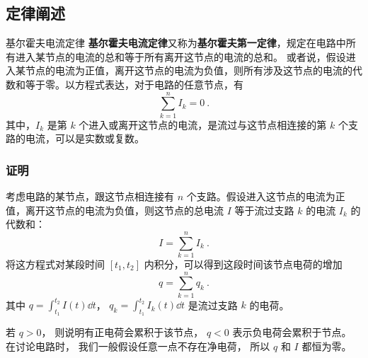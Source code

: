 

\subsection{定律阐述}
\begin{theorem}{基尔霍夫电流定律}
\textbf{基尔霍夫电流定律}又称为\textbf{基尔霍夫第一定律}，规定在电路中所有进入某节点的电流的总和等于所有离开这节点的电流的总和。 或者说，假设进入某节点的电流为正值，离开这节点的电流为负值，则所有涉及这节点的电流的代数和等于零。以方程式表达，对于电路的任意节点，有
\begin{equation}
\sum_{k=1}^n I_k =0~.
\end{equation}
其中，$I_k$ 是第 $k$ 个进入或离开这节点的电流，是流过与这节点相连接的第 $k$ 个支路的电流，可以是实数或复数。
\end{theorem}

\subsubsection{证明}
考虑电路的某节点，跟这节点相连接有 $n$ 个支路。假设进入这节点的电流为正值，离开这节点的电流为负值，则这节点的总电流 $I$ 等于流过支路 $k$ 的电流 $I_k$ 的代数和：
\begin{equation}
I=\sum_{k=1}^n I_k~.
\end{equation}
将这方程式对某段时间 $[t_1, t_2]$ 内积分，可以得到这段时间该节点电荷的增加
\begin{equation}
q=\sum_{k=1}^n q_k~.
\end{equation}
其中 $q = \int_{t_1}^{t_2} I(t) \dd{t}$， $q_k=\int_{t_1}^{t_2} I_k(t) \dd{t}$ 是流过支路 $k$ 的电荷。

若 $q>0$， 则说明有正电荷会累积于该节点， $q < 0$ 表示负电荷会累积于节点。 在讨论电路时， 我们一般假设任意一点不存在净电荷， 所以 $q$ 和 $I$ 都恒为零。

